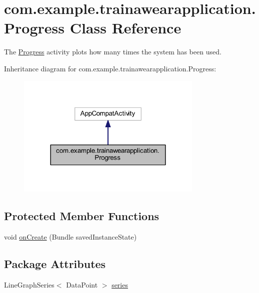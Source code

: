 \hypertarget{classcom_1_1example_1_1trainawearapplication_1_1_progress}{}\section{com.\+example.\+trainawearapplication.\+Progress Class Reference}
\label{classcom_1_1example_1_1trainawearapplication_1_1_progress}


The \mbox{\hyperlink{classcom_1_1example_1_1trainawearapplication_1_1_progress}{Progress}} activity plots how many times the system has been used.  




Inheritance diagram for com.\+example.\+trainawearapplication.\+Progress\+:
\nopagebreak
\begin{figure}[H]
\begin{center}
\leavevmode
\includegraphics[width=252pt]{classcom_1_1example_1_1trainawearapplication_1_1_progress__inherit__graph}
\end{center}
\end{figure}
\subsection*{Protected Member Functions}
\begin{DoxyCompactItemize}
\item 
void \mbox{\hyperlink{classcom_1_1example_1_1trainawearapplication_1_1_progress_a839ad2f2cb526d70b32c517f54400f36}{on\+Create}} (Bundle saved\+Instance\+State)
\end{DoxyCompactItemize}
\subsection*{Package Attributes}
\begin{DoxyCompactItemize}
\item 
Line\+Graph\+Series$<$ Data\+Point $>$ \mbox{\hyperlink{classcom_1_1example_1_1trainawearapplication_1_1_progress_aabc138eefea8d53b722c9b0a19262c90}{series}}
\end{DoxyCompactItemize}


